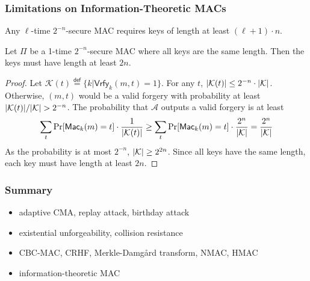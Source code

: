 \begin{frame}\frametitle{Limitations on Information-Theoretic MACs}
Any $\ell$-time $2^{-n}$-secure MAC requires keys of length at least $(\ell +1) \cdot n$. 
\begin{theorem}
Let $\Pi$ be a 1-time $2^{-n}$-secure MAC where all keys are the same length. Then the keys must have length at least $2n$.
\end{theorem}
\begin{proof}
Let $\mathcal{K}(t) \overset{\mathsf{def}}{=} \{ k | \mathsf{Vrfy}_k(m, t) = 1\}$. For any $t$, $\lvert\mathcal{K}(t)\rvert \leq 2^{-n} \cdot \lvert\mathcal{K}\rvert$. Otherwise, $(m, t)$ would be a valid forgery with probability at least $\lvert\mathcal{K}(t)\rvert/\lvert\mathcal{K}\rvert> 2^{-n}$. The probability that $\mathcal{A}$ outputs a valid forgery is at least
\[ \sum_{t} \Pr [\mathsf{Mac}_k(m) = t] \cdot \frac{1}{\lvert\mathcal{K}(t)\rvert} \geq \sum_{t} \Pr [\mathsf{Mac}_k(m) = t] \cdot \frac{2^n}{\lvert\mathcal{K}\rvert} = \frac{2^n}{\lvert\mathcal{K}\rvert} 
\]
As the probability is at most $2^{-n}$, $\lvert\mathcal{K}\rvert \geq 2^{2n}$. Since all keys have the same length, each key must have length at least $2n$.
\end{proof} 
\end{frame}
\begin{frame}\frametitle{Summary}
\begin{itemize}
\item adaptive CMA, replay attack, birthday attack 
\item existential unforgeability, collision resistance
\item CBC-MAC, CRHF, Merkle-Damg\r{a}rd transform, NMAC, HMAC
\item information-theoretic MAC
\end{itemize}
\end{frame}

